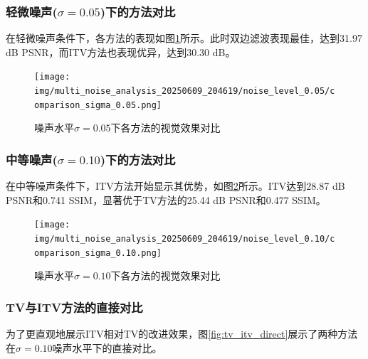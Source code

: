 \documentclass[a4paper,12pt]{ctexart}
\begin{document}
\subsubsection{轻微噪声($\sigma=0.05$)下的方法对比}

在轻微噪声条件下，各方法的表现如图\ref{fig:comparison_005}所示。此时双边滤波表现最佳，达到31.97 dB PSNR，而ITV方法也表现优异，达到30.30 dB。

\begin{figure}[H]
\centering
\texttt{[image: img/multi\_noise\_analysis\_20250609\_204619/noise\_level\_0.05/comparison\_sigma\_0.05.png]}
\caption{噪声水平$\sigma=0.05$下各方法的视觉效果对比}
\label{fig:comparison_005}
\end{figure}

\subsubsection{中等噪声($\sigma=0.10$)下的方法对比}

在中等噪声条件下，ITV方法开始显示其优势，如图\ref{fig:comparison_010}所示。ITV达到28.87 dB PSNR和0.741 SSIM，显著优于TV方法的25.44 dB PSNR和0.477 SSIM。

\begin{figure}[H]
\centering
\texttt{[image: img/multi\_noise\_analysis\_20250609\_204619/noise\_level\_0.10/comparison\_sigma\_0.10.png]}
\caption{噪声水平$\sigma=0.10$下各方法的视觉效果对比}
\label{fig:comparison_010}
\end{figure}

\subsubsection{TV与ITV方法的直接对比}

为了更直观地展示ITV相对TV的改进效果，图\ref{fig:tv_itv_direct}展示了两种方法在$\sigma=0.10$噪声水平下的直接对比。
\end{document}
